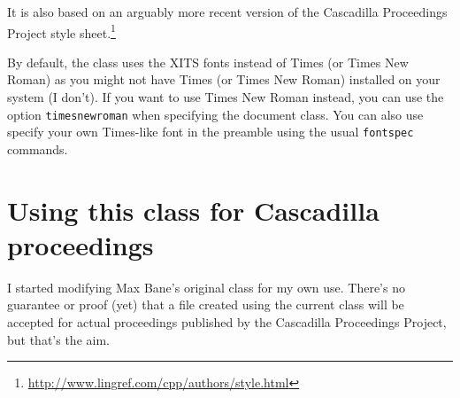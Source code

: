 \documentclass{cascadilla-xelatex-biblatex}
\begin{document}
It is also based on an arguably more recent version of the Cascadilla
Proceedings Project style
sheet.\footnote{\url{http://www.lingref.com/cpp/authors/style.html}}

By default, the class uses the XITS fonts instead of Times (or Times New Roman)
as you might not have Times (or Times New Roman) installed on your system (I
don't). If you want to use Times New Roman instead, you can use the option
\texttt{timesnewroman} when specifying the document class. You can also use
specify your own Times-like font in the preamble using the usual
\texttt{fontspec} commands.

\section{Using this class for Cascadilla proceedings}

I started modifying Max Bane's original class for my own use. There's no
guarantee or proof (yet) that a file created using the current class will be
accepted for actual proceedings published by the Cascadilla Proceedings
Project, but that's the aim.

\printbibliography
\end{document}

